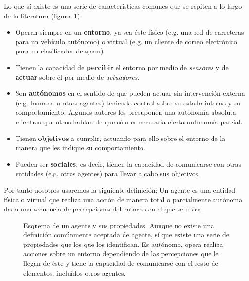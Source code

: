 Lo que sí existe es una serie de características comunes que se repiten a lo largo de la literatura (figura~\ref{fig:agent-properties}):

\begin{itemize}
	\item Operan siempre en un \textbf{entorno}, ya sea éste físico (e.g. una red de carreteras para un vehículo autónomo) o virtual (e.g. un cliente de correo electrónico para un clasificador de spam).
	\item Tienen la capacidad de \textbf{percibir} el entorno por medio de \textit{sensores} y de \textbf{actuar} sobre él por medio de \textit{actuadores}.
	\item Son \textbf{autónomos} en el sentido de que pueden actuar sin intervención externa (e.g. humana u otros agentes) teniendo control sobre su estado interno y su comportamiento. Algunos autores les presuponen una autonomía absoluta mientras que otros hablan de que sólo es necesaria cierta autonomía parcial.
	\item Tienen \textbf{objetivos} a cumplir, actuando para ello sobre el entorno de la manera que les indique su comportamiento.
	\item Pueden ser \textbf{sociales}, es decir, tienen la capacidad de comunicarse con otras entidades (e.g. otros agentes) para llevar a cabo sus objetivos.
\end{itemize}

Por tanto nosotros usaremos la siguiente definición: Un agente es una entidad física o virtual que realiza una acción de manera total o parcialmente autónoma dada una secuencia de percepciones del entorno en el que se ubica.

\begin{figure}
	\caption[Esquema de agente y sus propiedades]{Esquema de un agente y sus propiedades. Aunque no existe una definición comúnmente aceptada de agente, sí que existe una serie de propiedades que los que los identifican. Es autónomo, opera realiza acciones sobre un entorno dependiendo de las percepciones que le llegan de éste y tiene la capacidad de comunicarse con el resto de elementos, incluídos otros agentes.}
	\label{fig:agent-properties}
\end{figure}

